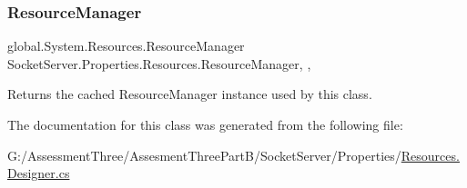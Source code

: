 \subsubsection{\texorpdfstring{Resource\+Manager}{ResourceManager}}
{\footnotesize\ttfamily global.\+System.\+Resources.\+Resource\+Manager Socket\+Server.\+Properties.\+Resources.\+Resource\+Manager\hspace{0.3cm}{\ttfamily [static]}, {\ttfamily [get]}, {\ttfamily [package]}}



Returns the cached Resource\+Manager instance used by this class. 



The documentation for this class was generated from the following file\+:\begin{DoxyCompactItemize}
\item 
G\+:/\+Assessment\+Three/\+Assesment\+Three\+Part\+B/\+Socket\+Server/\+Properties/\hyperlink{_socket_server_2_properties_2_resources_8_designer_8cs}{Resources.\+Designer.\+cs}\end{DoxyCompactItemize}
